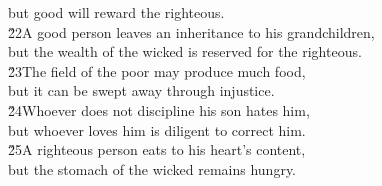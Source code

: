 \begin{poetry}
\poemll    but good will reward the righteous. \\
\poeml \v{22}A good person leaves an inheritance to his grandchildren, \\
\poemll    but the wealth of the wicked is reserved for the righteous. \\
\poeml \v{23}The field of the poor may produce much food, \\
\poemll    but it can be swept away through injustice. \\
\poeml \v{24}Whoever does not discipline his son hates him, \\
\poemll    but whoever loves him is diligent to correct him. \\
\poeml \v{25}A righteous person eats to his heart's content, \\
\poemll    but the stomach of the wicked remains hungry.
\end{poetry}

